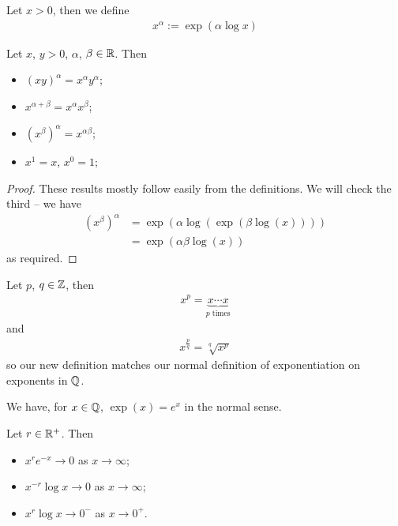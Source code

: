 \documentclass{../../template/note}
\begin{document}
    \begin{definition}[Exponentiation]
        Let \(x > 0\), then we define
        \begin{align*}
            x^\alpha := \exp(\alpha \log x)
        \end{align*}
    \end{definition}
    
    \begin{lemma}
        Let \(x\), \(y > 0\), \(\alpha\), \(\beta \in \mathbb R\). Then
        \begin{itemize}
            \item \((xy)^\alpha = x^\alpha y^\alpha\);
            \item \(x^{\alpha+\beta} = x^\alpha x^\beta\);
            \item \((x^\beta)^\alpha = x^{\alpha\beta}\);
            \item \(x^1 = x\), \(x^0 = 1\);
        \end{itemize}
    \end{lemma}
    
    \begin{proof}
        These results mostly follow easily from the definitions. We will check the third -- we have
        \begin{align*}
            (x^\beta)^\alpha &= \exp(\alpha \log(\exp(\beta \log(x)))) \\
            &= \exp(\alpha \beta \log(x))
        \end{align*}
        as required.        
    \end{proof}
    
    \begin{corollary}
        Let \(p\), \(q \in \mathbb Z\), then
        \begin{align*}
            x^p = \underbrace{x \cdots x}_{p \text{ times}}
        \end{align*}
        and
        \begin{align*}
            x^{\frac p q} = \sqrt[q]{x^p}
        \end{align*}
        so our new definition matches our normal definition of exponentiation on exponents in \(\mathbb Q\).
    \end{corollary}
    
    \begin{corollary}
        We have, for \(x \in \mathbb Q\), \(\exp(x) = e^x\) in the normal sense.
    \end{corollary}
    
    \begin{proposition}
        Let \(r \in \mathbb R^+\). Then
        \begin{itemize}
            \item \(x^r e^{-x} \to 0\) as \(x \to \infty\);
            \item \(x^{-r} \log x \to 0\) as \(x \to \infty\);
            \item \(x^r \log x \to 0^-\) as \(x \to 0^+\).
        \end{itemize}
    \end{proposition}
    
\end{document}
